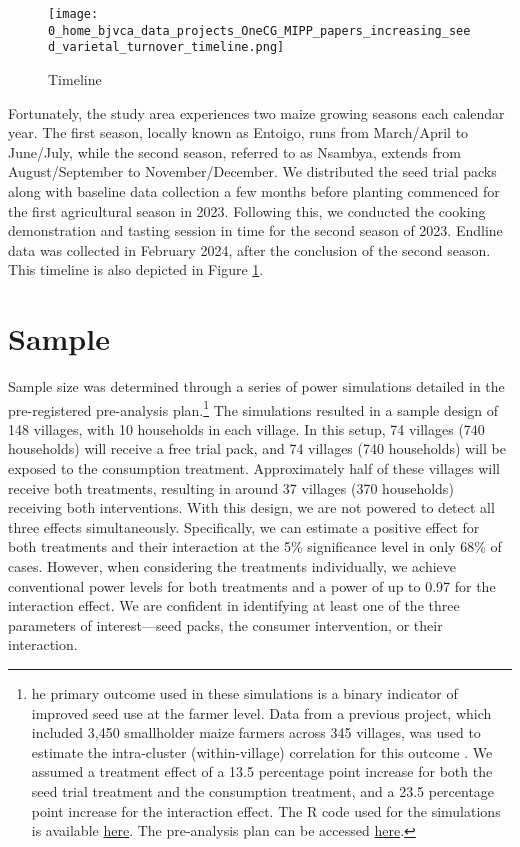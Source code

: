 \documentclass[english]{article}\usepackage[]{graphicx}\usepackage[]{xcolor}
\begin{document}
\begin{figure}
\begin{centering}
\texttt{[image: 0\_home\_bjvca\_data\_projects\_OneCG\_MIPP\_papers\_increasing\_seed\_varietal\_turnover\_timeline.png]}
\par\end{centering}
\caption{Timeline\label{fig:Timeline}}
\end{figure}

Fortunately, the study area experiences two maize growing seasons
each calendar year. The first season, locally known as Entoigo, runs
from March/April to June/July, while the second season, referred to
as Nsambya, extends from August/September to November/December. We
distributed the seed trial packs along with baseline data collection
a few months before planting commenced for the first agricultural
season in 2023. Following this, we conducted the cooking demonstration
and tasting session in time for the second season of 2023. Endline
data was collected in February 2024, after the conclusion of the second
season. This timeline is also depicted in Figure \ref{fig:Timeline}.

\section{Sample}

Sample size was determined through a series of power simulations detailed
in the pre-registered pre-analysis plan.\footnote{he primary outcome used in these simulations is a binary indicator
of improved seed use at the farmer level. Data from a previous project,
which included 3,450 smallholder maize farmers across 345 villages,
was used to estimate the intra-cluster (within-village) correlation
for this outcome \citep{miehe2023perceived}. We assumed a treatment
effect of a 13.5 percentage point increase for both the seed trial
treatment and the consumption treatment, and a 23.5 percentage point
increase for the interaction effect. The R code used for the simulations
is available \href{https://github.com/bjvca/mippi_UG/blob/master/study_design/power_analysis.R}{here}.
The pre-analysis plan can be accessed \href{https://github.com/bjvca/mippi_UG/blob/master/study_design/MIPPI_PAP.pdf}{here}.} The simulations resulted in a sample design of 148 villages, with
10 households in each village. In this setup, 74 villages (740 households)
will receive a free trial pack, and 74 villages (740 households) will
be exposed to the consumption treatment. Approximately half of these
villages will receive both treatments, resulting in around 37 villages
(370 households) receiving both interventions. With this design, we
are not powered to detect all three effects simultaneously. Specifically,
we can estimate a positive effect for both treatments and their interaction
at the 5\% significance level in only 68\% of cases. However, when
considering the treatments individually, we achieve conventional power
levels for both treatments and a power of up to 0.97 for the interaction
effect. We are confident in identifying at least one of the three
parameters of interest---seed packs, the consumer intervention, or
their interaction.
\end{document}
